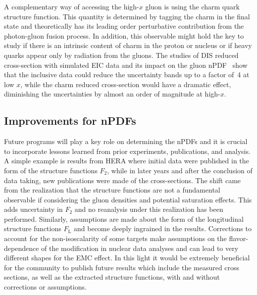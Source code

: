 A complementary way of accessing the high-$x$ gluon is using the charm quark structure function. This quantity is determined by tagging the charm in the final state and theoretically has its leading order perturbative contribution from the photon-gluon fusion process. In addition, this observable might hold the key to study if there is an intrinsic content of charm in the proton or nucleus or if heavy quarks appear only by radiation from the gluons. The studies of DIS reduced cross-section with simulated EIC data and its impact on the gluon nPDF~\cite{PhysRevD.96.114005} show that the inclusive data could reduce the uncertainty bands up to a factor of~4 at low $x$, while the charm reduced cross-section would have a dramatic effect, diminishing the uncertainties by almost an order of magnitude at high-$x$.   

\subsection{Improvements for nPDFs}

Future programs will play a key role on determining the nPDFs and it is crucial to incorporate lessons learned from prior experiments, publications, and analysis. A simple example is results from HERA where initial data were published in the form of the structure functions $F_{2}$, while in later years and after the conclusion of data taking, new publications were made of the cross-sections. The shift came from the realization that the structure functions are not a fundamental observable if considering the gluon densities and potential saturation effects. This adds uncertainty in $F_{2}$ and no reanalysis under this realization has been performed.  Similarly, assumptions are made about the form of the longitudinal structure functions $F_\mathrm{L}$ and become deeply ingrained in the results.  Corrections 
to account for the non-isoscalarity of some targets make assumptions on the flavor-dependence of the modification in nuclear data analyses and can lead to very different shapes for the EMC effect.  In this light it would be extremely beneficial for the community to publish future results which include the measured cross sections, as well as the extracted structure functions, with and without corrections or assumptions. 
